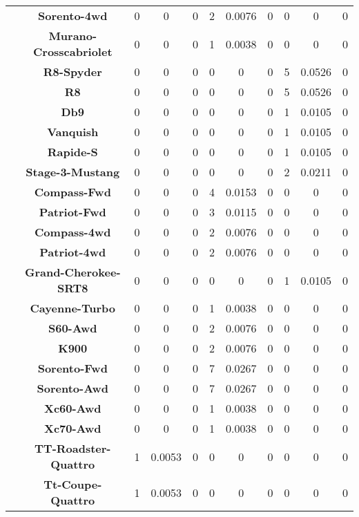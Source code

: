 \begin{center}
\begin{tabular}{|c|c||@{\hspace{1ex}}||c|c|c||@{\hspace{1ex}}||c|c|c||@{\hspace{1ex}}||c|c|c||@{\hspace{1ex}}||}
\cline{2-11}
  & {\bf Sorento-4wd} & 0 & 0 & 0 & 2 & 0.0076 & 0 & 0 & 0 & 0 \\
\cline{2-11}
  & {\bf Murano-Crosscabriolet} & 0 & 0 & 0 & 1 & 0.0038 & 0 & 0 & 0 & 0 \\
\cline{2-11}
  & {\bf R8-Spyder} & 0 & 0 & 0 & 0 & 0 & 0 & 5 & 0.0526 & 0 \\
\cline{2-11}
  & {\bf R8} & 0 & 0 & 0 & 0 & 0 & 0 & 5 & 0.0526 & 0 \\
\cline{2-11}
  & {\bf Db9} & 0 & 0 & 0 & 0 & 0 & 0 & 1 & 0.0105 & 0 \\
\cline{2-11}
  & {\bf Vanquish} & 0 & 0 & 0 & 0 & 0 & 0 & 1 & 0.0105 & 0 \\
\cline{2-11}
  & {\bf Rapide-S} & 0 & 0 & 0 & 0 & 0 & 0 & 1 & 0.0105 & 0 \\
\cline{2-11}
  & {\bf Stage-3-Mustang} & 0 & 0 & 0 & 0 & 0 & 0 & 2 & 0.0211 & 0 \\
\cline{2-11}
  & {\bf Compass-Fwd} & 0 & 0 & 0 & 4 & 0.0153 & 0 & 0 & 0 & 0 \\
\cline{2-11}
  & {\bf Patriot-Fwd} & 0 & 0 & 0 & 3 & 0.0115 & 0 & 0 & 0 & 0 \\
\cline{2-11}
  & {\bf Compass-4wd} & 0 & 0 & 0 & 2 & 0.0076 & 0 & 0 & 0 & 0 \\
\cline{2-11}
  & {\bf Patriot-4wd} & 0 & 0 & 0 & 2 & 0.0076 & 0 & 0 & 0 & 0 \\
\cline{2-11}
  & {\bf Grand-Cherokee-SRT8} & 0 & 0 & 0 & 0 & 0 & 0 & 1 & 0.0105 & 0 \\
\cline{2-11}
  & {\bf Cayenne-Turbo} & 0 & 0 & 0 & 1 & 0.0038 & 0 & 0 & 0 & 0 \\
\cline{2-11}
  & {\bf S60-Awd} & 0 & 0 & 0 & 2 & 0.0076 & 0 & 0 & 0 & 0 \\
\cline{2-11}
  & {\bf K900} & 0 & 0 & 0 & 2 & 0.0076 & 0 & 0 & 0 & 0 \\
\cline{2-11}
  & {\bf Sorento-Fwd} & 0 & 0 & 0 & 7 & 0.0267 & 0 & 0 & 0 & 0 \\
\cline{2-11}
  & {\bf Sorento-Awd} & 0 & 0 & 0 & 7 & 0.0267 & 0 & 0 & 0 & 0 \\
\cline{2-11}
  & {\bf Xc60-Awd} & 0 & 0 & 0 & 1 & 0.0038 & 0 & 0 & 0 & 0 \\
\cline{2-11}
  & {\bf Xc70-Awd} & 0 & 0 & 0 & 1 & 0.0038 & 0 & 0 & 0 & 0 \\
\cline{2-11}
  & {\bf TT-Roadster-Quattro} & 1 & 0.0053 & 0 & 0 & 0 & 0 & 0 & 0 & 0 \\
\cline{2-11}
  & {\bf Tt-Coupe-Quattro} & 1 & 0.0053 & 0 & 0 & 0 & 0 & 0 & 0 & 0 \\

\end{tabular}
\end{center}
